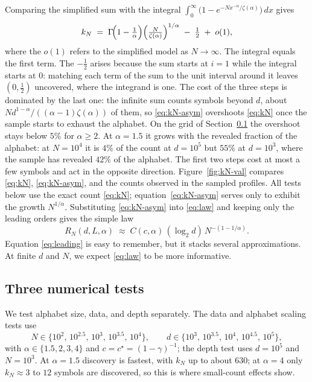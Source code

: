 \documentclass[11pt]{article}
\newcommand{\cstar}{c^{\star}}
\begin{document}
Comparing the simplified sum with the integral
$\int_0^\infty \bigl(1-e^{-N x^{-\alpha}/\zeta(\alpha)}\bigr)\,dx$
gives
\begin{equation}
k_N \;=\; \Gamma\!\Bigl(1-\tfrac1\alpha\Bigr)
\Bigl(\tfrac{N}{\zeta(\alpha)}\Bigr)^{1/\alpha}
\;-\; \tfrac12 \;+\; o(1),
\label{eq:kN-asym}
\end{equation}
where the $o(1)$ refers to the simplified model as $N \to \infty$.
The integral equals the first term. The $-\tfrac12$ arises because the sum starts at $i=1$ while the
integral starts at $0$: matching each term of the sum to the unit
interval around it leaves $(0,\tfrac12)$ uncovered, where the
integrand is one.
The cost of the three steps is dominated by the last one: the
infinite sum counts symbols beyond $d$, about
$N d^{1-\alpha}/((\alpha-1)\zeta(\alpha))$ of them, so
\eqref{eq:kN-asym} overshoots \eqref{eq:kN} once the sample starts
to exhaust the alphabet. On the grid of Section~\ref{sec:tests} the
overshoot stays below $5\%$ for $\alpha \ge 2$. At $\alpha = 1.5$ it
grows with the revealed fraction of the alphabet: at $N = 10^4$ it
is $4\%$ of the count at $d = 10^5$ but $55\%$ at $d = 10^3$, where
the sample has revealed $42\%$ of the alphabet. The first two steps
cost at most a few symbols and act in the opposite direction.
Figure~\ref{fig:kN-val} compares \eqref{eq:kN}, \eqref{eq:kN-asym},
and the counts observed in the sampled profiles. All tests below use
the exact count \eqref{eq:kN}; equation~\eqref{eq:kN-asym} serves
only to exhibit the growth $N^{1/\alpha}$.
Substituting \eqref{eq:kN-asym} into \eqref{eq:law} and keeping only
the leading orders gives the simple law
\begin{equation}
R_N(d, L, \alpha) \;\approx\; C(c,\alpha)\,(\log_2 d)\,
N^{-(1-1/\alpha)}.
\label{eq:leading}
\end{equation}
Equation \eqref{eq:leading} is easy to remember, but it stacks
several approximations. At finite $d$ and $N$, we expect
\eqref{eq:law} to be more informative.
\subsection{Three numerical tests}
\label{sec:tests}
We test alphabet size, data, and depth separately. The data and alphabet scaling tests use
\begin{equation*}
N \in \{10^{2},\, 10^{2.5},\, 10^{3},\, 10^{3.5},\, 10^{4}\},
\qquad
d \in \{10^{3},\, 10^{3.5},\, 10^{4},\, 10^{4.5},\, 10^{5}\},
\end{equation*}
with $\alpha \in \{1.5, 2, 3, 4\}$ and $c = \cstar =
(1-\gamma)^{-1}$; the depth test uses $d = 10^{5}$ and $N = 10^{3}$.
At $\alpha = 1.5$ discovery is fastest, with $k_N$ up to about 630;
at $\alpha = 4$ only $k_N \approx 3$ to $12$ symbols are discovered,
so this is where small-count effects show.
\end{document}
